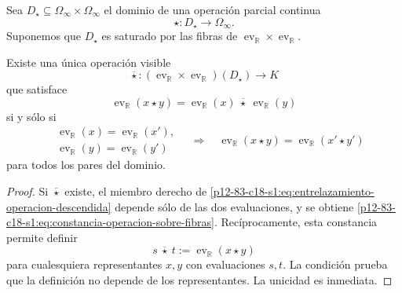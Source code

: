 Sea \(D_\star\subseteq\Omega_\infty\times\Omega_\infty\) el dominio de una
operación parcial continua
\begin{equation}
 \star:D_\star\longrightarrow\Omega_\infty.
 \label{p12-83-c18-s1:eq:operacion-historias-u024}
\end{equation}
Suponemos que \(D_\star\) es saturado por las fibras de
\(\operatorname{ev}_{\mathbb R}\times\operatorname{ev}_{\mathbb R}\).

\begin{theorem}
\label{p12-83-c18-s1:thm:criterio-descenso-operaciones-u024}
Existe una única operación visible
\begin{equation}
 \overline\star:
 (\operatorname{ev}_{\mathbb R}\times\operatorname{ev}_{\mathbb R})
 (D_\star)\longrightarrow K
 \label{p12-83-c18-s1:eq:operacion-descendida-visible}
\end{equation}
que satisface
\begin{equation}
 \operatorname{ev}_{\mathbb R}(x\star y)
 =\operatorname{ev}_{\mathbb R}(x)
  \ \overline\star\ 
  \operatorname{ev}_{\mathbb R}(y)
 \label{p12-83-c18-s1:eq:entrelazamiento-operacion-descendida}
\end{equation}
si y sólo si
\begin{equation}
 \begin{split}
 &\operatorname{ev}_{\mathbb R}(x)=
  \operatorname{ev}_{\mathbb R}(x'),\\
 &\operatorname{ev}_{\mathbb R}(y)=
  \operatorname{ev}_{\mathbb R}(y')
 \end{split}
 \quad\Longrightarrow\quad
 \operatorname{ev}_{\mathbb R}(x\star y)=
 \operatorname{ev}_{\mathbb R}(x'\star y')
 \label{p12-83-c18-s1:eq:constancia-operacion-sobre-fibras}
\end{equation}
para todos los pares del dominio.
\end{theorem}

\begin{proof}
Si \(\overline\star\) existe, el miembro derecho de
\eqref{p12-83-c18-s1:eq:entrelazamiento-operacion-descendida} depende sólo de las dos
evaluaciones, y se obtiene
\eqref{p12-83-c18-s1:eq:constancia-operacion-sobre-fibras}. Recíprocamente, esta
constancia permite definir
\[
 s\ \overline\star\ t
 :=\operatorname{ev}_{\mathbb R}(x\star y)
\]
para cualesquiera representantes \(x,y\) con evaluaciones \(s,t\). La
condición prueba que la definición no depende de los representantes. La
unicidad es inmediata.
\end{proof}


